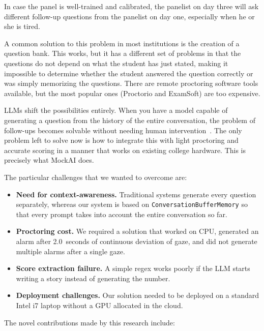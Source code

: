 \documentclass[conference]{IEEEtran}
\begin{document}
In case the panel is well-trained and calibrated, the panelist on day
three will ask different follow-up questions from the panelist on day
one, especially when he or she is tired.

A common solution to this problem in most institutions is the creation
of a question bank. This works, but it has a different set of problems
in that the questions do not depend on what the student has just
stated, making it impossible to determine whether the student answered
the question correctly or was simply memorizing the questions. There
are remote proctoring software tools available, but the most popular
ones (Proctorio and ExamSoft) are too expensive.

LLMs shift the possibilities entirely. When you have a model capable
of generating a question from the history of the entire conversation,
the problem of follow-ups becomes solvable without needing human
intervention~\cite{brown2020gpt3}. The only problem left to solve now
is how to integrate this with light proctoring and accurate scoring in
a manner that works on existing college hardware. This is precisely
what MockAI does.

The particular challenges that we wanted to overcome are:

\begin{itemize}
  \item \textbf{Need for context-awareness.} Traditional systems generate
        every question separately, whereas our system is based on
        \texttt{ConversationBufferMemory} so that every prompt takes
        into account the entire conversation so far.
  \item \textbf{Proctoring cost.} We required a solution that worked on
        CPU, generated an alarm after 2.0~seconds of continuous
        deviation of gaze, and did not generate multiple alarms after a
        single gaze.
  \item \textbf{Score extraction failure.} A simple regex works poorly if
        the LLM starts writing a story instead of generating the number.
  \item \textbf{Deployment challenges.} Our solution needed to be
        deployed on a standard Intel i7 laptop without a GPU allocated
        in the cloud.
\end{itemize}

The novel contributions made by this research include:
\end{document}
